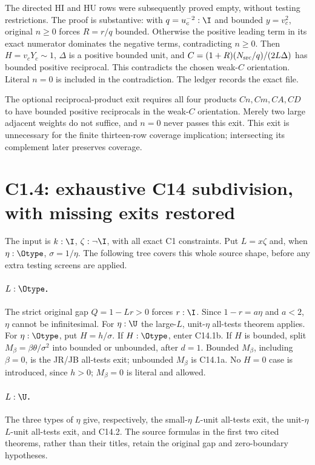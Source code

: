 The directed HI and HU rows were subsequently proved empty, without
testing restrictions. The proof is substantive: with $q=u_c^{-2}:\I$
and bounded $y=v_c^2$, original $n\ge0$ forces $R=r/q$ bounded.
Otherwise the positive leading term in its exact numerator dominates
the negative terms, contradicting $n\ge0$. Then $H=v_cY_c\sim1$,
$\Delta$ is a positive bounded unit, and
$C=(1+R)(N_{\rm src}/q)/(2L\Delta)$ has bounded positive reciprocal.
This contradicts the chosen weak-$C$ orientation. Literal $n=0$ is
included in the contradiction. The ledger records the exact file.

The optional reciprocal-product exit requires all four products
$Cn,Cm,CA,CD$ to have bounded positive reciprocals in the weak-$C$
orientation. Merely two large adjacent weights do not suffice, and
$n=0$ never passes this exit. This exit is unnecessary for the finite
thirteen-row coverage implication; intersecting its complement later
preserves coverage.

\section{C1.4: exhaustive C14 subdivision, with missing exits restored}

The input is $k:\I$, $\zeta:\neg\I$, with all exact C1 constraints.
Put $L=x\zeta$ and, when $\eta:\Otype$, $\sigma=1/\eta$.
The following tree covers this whole source shape, before any extra
testing screens are applied.

\paragraph{$L:\Otype$.}
The strict original gap $Q=1-Lr>0$ forces $r:\I$.
Since $1-r=a\eta$ and $a<2$, $\eta$ cannot be infinitesimal.
For $\eta:\U$ the large-$L$, unit-$\eta$ all-tests theorem applies.
For $\eta:\Otype$, put $H=h/\sigma$. If $H:\Otype$, enter C14.1b.
If $H$ is bounded, split
$M_\beta=\beta\theta/\sigma^2$ into bounded or unbounded, after
$d=1$. Bounded $M_\beta$, including $\beta=0$, is the JR/JB all-tests
exit; unbounded $M_\beta$ is C14.1a. No $H=0$ case is introduced,
since $h>0$; $M_\beta=0$ is literal and allowed.

\paragraph{$L:\U$.}
The three types of $\eta$ give, respectively, the small-$\eta$
$L$-unit all-tests exit, the unit-$\eta$ $L$-unit all-tests exit, and
C14.2. The source formulas in the first two cited theorems, rather than
their titles, retain the original gap and zero-boundary hypotheses.

